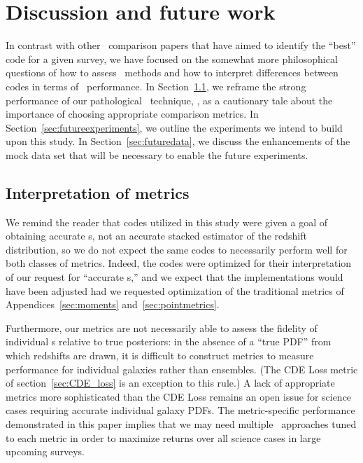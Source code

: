 \section{Discussion and future work}
\label{sec:discussion}
In contrast with other \pzpdf\ comparison papers that have aimed to identify the ``best'' code for a given survey, we have focused on the somewhat more philosophical questions of how to assess \pzpdf\ methods and how to interpret differences between codes in terms of \pzpdf\ performance.
In Section~\ref{sec:caution}, we reframe the strong performance of our pathological \pzpdf\ technique, \trainz, as a cautionary tale about the importance of choosing appropriate comparison metrics.
In Section~\ref{sec:futureexperiments}, we outline the experiments we intend to build upon this study.
In Section~\ref{sec:futuredata}, we discuss the enhancements of the mock data set that will be necessary to enable the future experiments.


\subsection{Interpretation of metrics}
\label{sec:caution}

We remind the reader that codes utilized in this study were given a goal of obtaining accurate \pzpdf s, not an accurate stacked estimator of the redshift distribution, so we do not expect the same codes to necessarily perform well for both classes of metrics.
Indeed, the codes were optimized for their interpretation of our request for ``accurate \pzpdf s,'' and we expect that the implementations would have been adjusted had we requested optimization of the traditional metrics of Appendices~\ref{sec:moments} and~\ref{sec:pointmetrics}.

Furthermore, our metrics are not necessarily able to assess the fidelity of individual \pzpdf s relative to true posteriors: in the absence of a ``true PDF'' from which redshifts are drawn, it is difficult to construct metrics to measure performance for individual galaxies rather than ensembles.
(The CDE Loss metric of section~\ref{sec:CDE_loss} is an exception to this rule.)
A lack of appropriate metrics more sophisticated than the CDE Loss remains an open issue for science cases requiring accurate individual galaxy PDFs.
The metric-specific performance demonstrated in this paper implies that we may need multiple \pzpdf\ approaches tuned to each metric in order to maximize returns over all science cases in large upcoming surveys.

